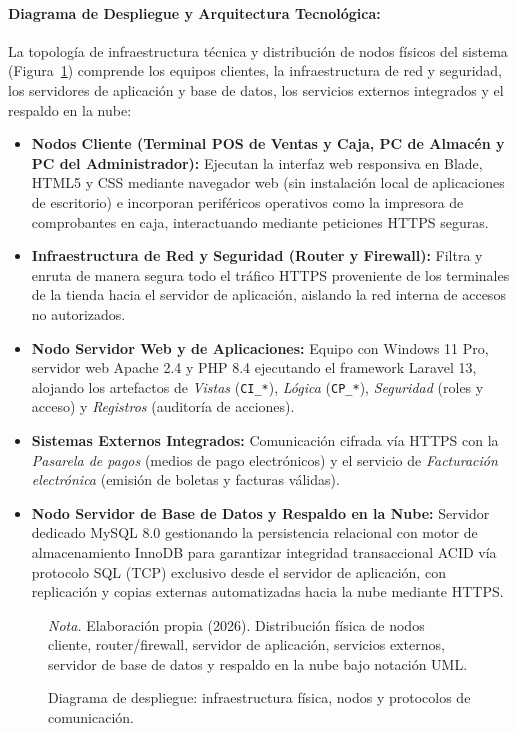 \documentclass[12pt,a4paper]{article}
\begin{document}
\paragraph{Diagrama de Despliegue y Arquitectura Tecnológica:}
La topología de infraestructura técnica y distribución de nodos físicos del sistema (Figura~\ref{fig:diagrama_despliegue}) comprende los equipos clientes, la infraestructura de red y seguridad, los servidores de aplicación y base de datos, los servicios externos integrados y el respaldo en la nube:
\begin{itemize}
    \item \textbf{Nodos Cliente (Terminal POS de Ventas y Caja, PC de Almacén y PC del Administrador):} Ejecutan la interfaz web responsiva en Blade, HTML5 y CSS mediante navegador web (sin instalación local de aplicaciones de escritorio) e incorporan periféricos operativos como la impresora de comprobantes en caja, interactuando mediante peticiones HTTPS seguras.
    \item \textbf{Infraestructura de Red y Seguridad (Router y Firewall):} Filtra y enruta de manera segura todo el tráfico HTTPS proveniente de los terminales de la tienda hacia el servidor de aplicación, aislando la red interna de accesos no autorizados.
    \item \textbf{Nodo Servidor Web y de Aplicaciones:} Equipo con Windows 11 Pro, servidor web Apache 2.4 y PHP 8.4 ejecutando el framework Laravel 13, alojando los artefactos de \emph{Vistas} (\texttt{CI\_*}), \emph{Lógica} (\texttt{CP\_*}), \emph{Seguridad} (roles y acceso) y \emph{Registros} (auditoría de acciones).
    \item \textbf{Sistemas Externos Integrados:} Comunicación cifrada vía HTTPS con la \emph{Pasarela de pagos} (medios de pago electrónicos) y el servicio de \emph{Facturación electrónica} (emisión de boletas y facturas válidas).
    \item \textbf{Nodo Servidor de Base de Datos y Respaldo en la Nube:} Servidor dedicado MySQL 8.0 gestionando la persistencia relacional con motor de almacenamiento InnoDB para garantizar integridad transaccional ACID vía protocolo SQL (TCP) exclusivo desde el servidor de aplicación, con replicación y copias externas automatizadas hacia la nube mediante HTTPS.
\end{itemize}

\begin{figure}[H]
  \centering
  \caption{Diagrama de despliegue: infraestructura física, nodos y protocolos de comunicación.}
  \label{fig:diagrama_despliegue}
  \resizebox{0.88\linewidth}{!}{}
  \par\vspace{0.2cm}
  {\raggedright \small \emph{Nota.} Elaboración propia (2026). Distribución física de nodos cliente, router/firewall, servidor de aplicación, servicios externos, servidor de base de datos y respaldo en la nube bajo notación UML.\par}
\end{figure}
\end{document}
